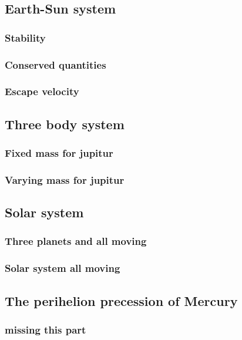 \subsection{Earth-Sun system}

\subsubsection{Stability}





\subsubsection{Conserved quantities}




\subsubsection{Escape velocity}








\subsection{Three body system}

\subsubsection{Fixed mass for jupitur}


\subsubsection{Varying mass for jupitur}




\subsection{Solar system}


\subsubsection{Three planets and all moving}


\subsubsection{Solar system all moving}





\subsection{The perihelion precession of Mercury}

\subsubsection{missing this part}